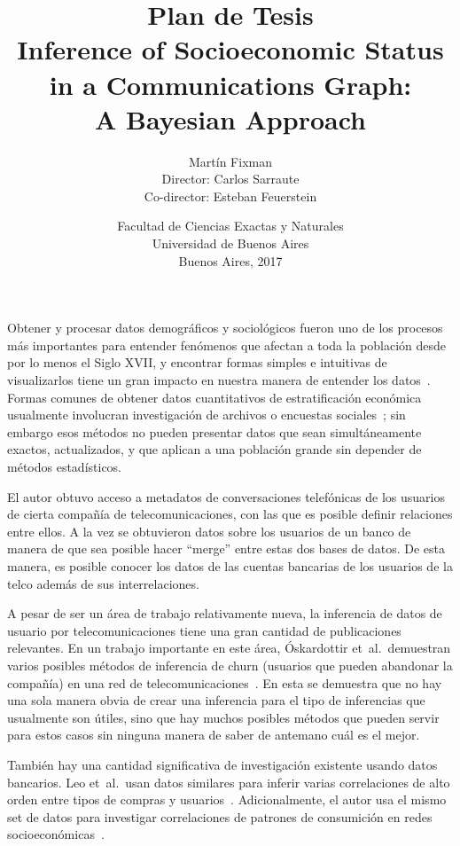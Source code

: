 \documentclass{article}
\title{Plan de Tesis\\\vspace{1em}\Large Inference of Socioeconomic Status\\in a Communications Graph:\\A Bayesian Approach}
\author{{\Large Martín Fixman}\\Director: Carlos Sarraute\\Co-director: Esteban Feuerstein}
\date{{\large Facultad de Ciencias Exactas y Naturales}\\{\large Universidad de Buenos Aires}\\Buenos Aires, 2017}
\begin{document}
\maketitle

\section*{}

Obtener y procesar datos demográficos y sociológicos fueron uno de los procesos más importantes para entender fenómenos que afectan a toda la población desde por lo menos el Siglo XVII, y encontrar formas simples e intuitivas de visualizarlos tiene un gran impacto en nuestra manera de entender los datos~\citep{minard1844,snow1855}. Formas comunes de obtener datos cuantitativos de estratificación económica usualmente involucran investigación de archivos o encuestas sociales~\citep{bulmer1977}; sin embargo esos métodos no pueden presentar datos que sean simultáneamente exactos, actualizados, y que aplican a una población grande sin depender de métodos estadísticos.

El autor obtuvo acceso a metadatos de conversaciones telefónicas de los usuarios de cierta compañía de telecomunicaciones, con las que es posible definir relaciones entre ellos. A la vez se obtuvieron datos sobre los usuarios de un banco de manera de que sea posible hacer ``merge'' entre estas dos bases de datos. De esta manera, es posible conocer los datos de las cuentas bancarias de los usuarios de la telco además de sus interrelaciones.

A pesar de ser un área de trabajo relativamente nueva, la inferencia de datos de usuario por telecomunicaciones tiene una gran cantidad de publicaciones relevantes. En un trabajo importante en este área, Óskardottir et~al.\ demuestran varios posibles métodos de inferencia de churn (usuarios que pueden abandonar la compañía) en una red de telecomunicaciones~\cite{oskardottir2016}. En esta se demuestra que no hay una sola manera obvia de crear una inferencia para el tipo de inferencias que usualmente son útiles, sino que hay muchos posibles métodos que pueden servir para estos casos sin ninguna manera de saber de antemano cuál es el mejor.

También hay una cantidad significativa de investigación existente usando datos bancarios. Leo et~al.\ usan datos similares para inferir varias correlaciones de alto orden entre tipos de compras y usuarios~\cite{leo2015socioeconomic}. Adicionalmente, el autor usa el mismo set de datos para investigar correlaciones de patrones de consumición en redes socioeconómicas~\cite{leo2016correlations}.
\end{document}
